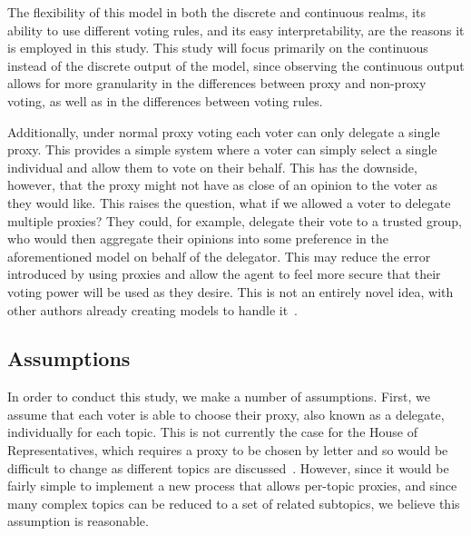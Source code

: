 The flexibility of this model in both the discrete and continuous realms, its ability
to use different voting rules, and its easy interpretability, are the reasons it is
employed in this study.
This study will focus primarily on the continuous instead of the discrete output of
the model, since observing the continuous output allows for more granularity in the
differences between proxy and non-proxy voting, as well as in the differences between
voting rules.

Additionally, under normal proxy voting each voter can only delegate a single proxy.
This provides a simple system where a voter can simply select a single individual and
allow them to vote on their behalf.
This has the downside, however, that the proxy might not have as close of an opinion
to the voter as they would like.
This raises the question, what if we allowed a voter to delegate multiple proxies?
They could, for example, delegate their vote to a trusted group, who would then
aggregate their opinions into some preference in the aforementioned model on behalf of
the delegator.
This may reduce the error introduced by using proxies and allow the agent to feel
more secure that their voting power will be used as they desire.
This is not an entirely novel idea, with other authors already creating models to
handle it~\cite{Degrave2014,Colley2021,Golz2021}.

\subsection{Assumptions}\label{subsec:assumptions}
In order to conduct this study, we make a number of assumptions.
First, we assume that each voter is able to choose their proxy, also known as a
delegate, individually for each topic.
This is not currently the case for the House of Representatives, which requires
a proxy to be chosen by letter and so would be difficult to change as different
topics are discussed~\cite{Congress.gov2020}.
However, since it would be fairly simple to implement a new process that allows
per-topic proxies, and since many complex topics can be reduced to a set of related
subtopics, we believe this assumption is reasonable.

